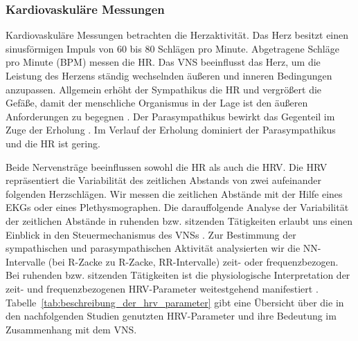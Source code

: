 \subsubsection{Kardiovaskuläre Messungen} 

\label{ssub:kardiovaskulare_messungen}

Kardiovaskuläre Messungen betrachten die Herzaktivität. Das Herz besitzt einen sinusförmigen Impuls von 60 bis 80 Schlägen pro Minute. Abgetragene Schläge pro Minute (\ac{BPM}) messen die HR. Das \acs{VNS} beeinflusst das Herz, um die Leistung des Herzens ständig wechselnden äußeren und inneren Bedingungen anzupassen. Allgemein erhöht der Sympathikus die HR und vergrößert die Gefäße, damit der menschliche Organismus in der Lage ist den äußeren Anforderungen zu begegnen \citep[][S.~226]{Porges1995}. Der Parasympathikus bewirkt das Gegenteil im Zuge der Erholung \citep[][S.~226]{Porges1995}. Im Verlauf der Erholung dominiert der Parasympathikus und die HR ist gering. 

Beide Nervensträge beeinflussen sowohl die HR als auch die \ac{HRV}. Die \ac{HRV} repräsentiert die Variabilität des zeitlichen Abstands von zwei aufeinander folgenden Herzschlägen. Wir messen die zeitlichen Abstände mit der Hilfe eines \ac{EKG}s oder eines Plethysmographen. Die darauffolgende Analyse der Variabilität der zeitlichen Abstände in ruhenden bzw. sitzenden Tätigkeiten erlaubt uns einen Einblick in den Steuermechanismus des \acs{VNS}s \citep{Jalife1983}. Zur Bestimmung der sympathischen und parasympathischen Aktivität analysierten wir die NN-Intervalle (bei R-Zacke zu R-Zacke, RR-Intervalle) zeit- oder frequenzbezogen. Bei ruhenden bzw. sitzenden Tätigkeiten ist die physiologische Interpretation der zeit- und frequenzbezogenen \ac{HRV}-Parameter weitestgehend manifestiert \citep[][S.~360]{TaskForce1996}. Tabelle~\ref{tab:beschreibung_der_hrv_parameter} gibt eine Übersicht über die in den nachfolgenden Studien genutzten \ac{HRV}-Parameter und ihre Bedeutung im Zusammenhang mit dem \acs{VNS}. 

